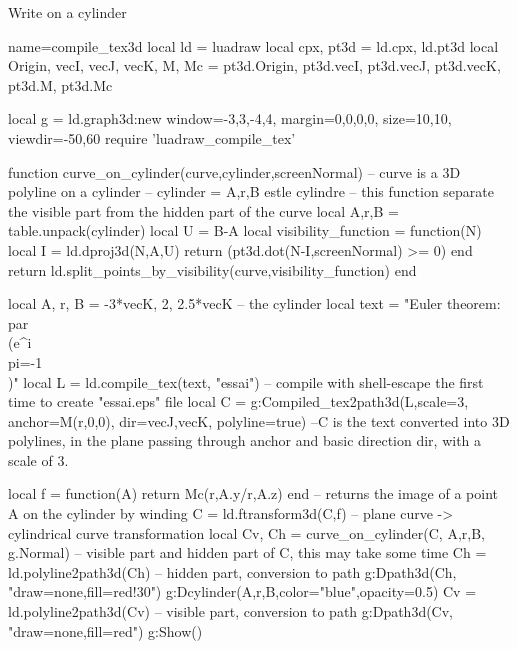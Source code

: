 \begin{demo}{Write on a cylinder}
\begin{luadraw}{name=compile_tex3d}
local ld = luadraw
local cpx, pt3d = ld.cpx, ld.pt3d
local Origin, vecI, vecJ, vecK, M, Mc = pt3d.Origin, pt3d.vecI, pt3d.vecJ, pt3d.vecK, pt3d.M, pt3d.Mc

local g = ld.graph3d:new{ window={-3,3,-4,4}, margin={0,0,0,0}, size={10,10}, viewdir={-50,60}}
require 'luadraw_compile_tex'

function curve_on_cylinder(curve,cylinder,screenNormal) 
-- curve is a 3D polyline on a cylinder
-- cylinder = {A,r,B} estle cylindre
-- this function separate the visible part from the hidden part of the curve
    local A,r,B = table.unpack(cylinder)
    local U = B-A
    local visibility_function = function(N)
        local I = ld.dproj3d(N,{A,U})
        return (pt3d.dot(N-I,screenNormal) >= 0)
    end
    return ld.split_points_by_visibility(curve,visibility_function)
end

local A, r, B = -3*vecK, 2, 2.5*vecK -- the cylinder
local text = "Euler theorem: \\par \\(e^{i\\pi}=-1\\)"
local L = ld.compile_tex(text, "essai") -- compile with shell-escape the first time to create "essai.eps" file
local C = g:Compiled_tex2path3d(L,{scale=3, anchor=M(r,0,0), dir={vecJ,vecK}, polyline=true})
--C is the text converted into 3D polylines, in the plane passing through anchor and basic direction dir, with a scale of 3.

local f = function(A) return Mc(r,A.y/r,A.z) end -- returns the image of a point A on the cylinder by winding
C = ld.ftransform3d(C,f) -- plane curve -> cylindrical curve transformation
local Cv, Ch = curve_on_cylinder(C, {A,r,B}, g.Normal) -- visible part and hidden part of C, this may take some time
Ch = ld.polyline2path3d(Ch) -- hidden part, conversion to path
g:Dpath3d(Ch, "draw=none,fill=red!30")
g:Dcylinder(A,r,B,{color="blue",opacity=0.5})
Cv = ld.polyline2path3d(Cv) -- visible part, conversion to path
g:Dpath3d(Cv, "draw=none,fill=red")
g:Show()
\end{luadraw}
\end{demo}
